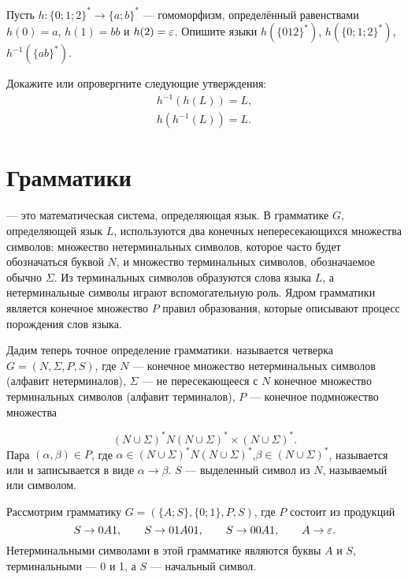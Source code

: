 \begin{myproblem}
Пусть $h\colon \{0;1;2\}^*\to\{a;b\}^*$ --- гомоморфизм, определённый равенствами $h(0)=a$, $h(1)=bb$ и $h(2)=\varepsilon$. Опишите языки $h(\{012\}^*)$, $h(\{0;1;2\}^*)$, $h^{-1}(\{ab\}^*)$.
\end{myproblem}


\begin{myproblem}
Докажите или опровергните следующие утверждения:
\begin{gather*}
h^{-1}(h(L))=L, \\
h(h^{-1}(L))=L.
\end{gather*}
\end{myproblem}

\section{Грамматики}
\label{Chapter1Grammars}

 --- это математическая система, определяющая язык.
В грамматике $G$, определяющей язык $L$, используются два конечных непересекающихся множества символов: множество нетерминальных символов, которое часто будет обозначаться буквой $N$, и множество терминальных символов, обозначаемое обычно $\Sigma$. Из терминальных символов образуются слова языка $L$, а нетерминальные символы играют вспомогательную роль. Ядром грамматики является конечное множество $P$ правил образования, которые описывают процесс порождения слов языка.

Дадим теперь точное определение грамматики.  называется четверка $G=(N,\Sigma,P,S)$, где $N$ --- конечное множество нетерминальных символов (алфавит нетерминалов), $\Sigma$ --- не пересекающееся с $N$ конечное множество терминальных символов (алфавит терминалов), $P$ --- конечное подмножество множества

\[
	(N\cup\Sigma)^*N(N\cup\Sigma)^* \times (N\cup\Sigma)^*.
\]
Пара $(\alpha,\beta)\in P$, где $\alpha\in(N\cup\Sigma)^*N(N\cup\Sigma)^*$,$\beta\in(N\cup\Sigma)^*$, называется  или  и записывается в виде $\alpha\to\beta$. $S$ --- выделенный символ из $N$, называемый  или
 символом.

\begin{myexample}
\label{example11}
Рассмотрим грамматику $G=(\{A;S\},\{0;1\},P,S)$, где $P$ состоит из продукций
\[	S \to 0A1,  \qquad
	S \to 01A01,\qquad
	S \to 00A1, \qquad
	A \to \varepsilon.
\]
Нетерминальными символами в этой грамматике являются буквы $A$ и $S$, терминальными --- 0 и 1, а $S$ --- начальный символ.
\end{myexample}

